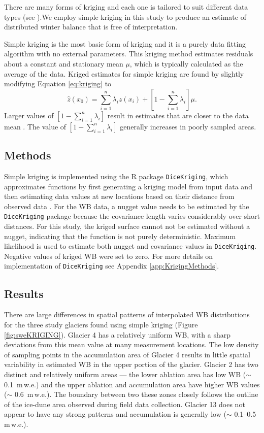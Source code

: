 \documentclass{sfuthesis}
\begin{document}
There are many forms of kriging and each one is tailored to suit different data types (see \cite{Li2014}).We employ simple kriging in this study to produce an estimate of distributed winter balance that is free of interpretation. 

Simple kriging is the most basic form of kriging and it is a purely data fitting algorithm with no external parameters. This kriging method estimates residuals about a constant and stationary mean $\mu$, which is typically calculated as the average of the data. Kriged estimates for simple kriging are found by slightly modifying Equation \ref{eq:kriging} to 
\begin{equation}
\hat{z}(x_0) = \sum_{i=1}^{n} \lambda_i z(x_i) +\left[1-\sum_{i=1}^{n} \lambda_i \right]\mu.
\end{equation}
Larger values of $\left[1-\sum_{i=1}^{n} \lambda_i \right]$ result in estimates that are closer to the data mean \citep{Li2008}. The value of $\left[1-\sum_{i=1}^{n} \lambda_i \right]$ generally increases in poorly sampled areas. 

\subsection{Methods}
\label{sec:kriging_methods}

Simple kriging is implemented using the R package \texttt{DiceKriging}, which approximates functions by first generating a kriging model from input data and then estimating data values at new locations based on their distance from observed data \citep{Roustant2012}. For the WB data, a nugget value needs to be estimated by the \texttt{DiceKriging} package because the covariance length varies considerably over short distances. For this study, the kriged surface cannot not be estimated without a nugget, indicating that the function is not purely deterministic. Maximum likelihood is used to estimate both nugget and covariance values in \texttt{DiceKriging}. Negative values of kriged WB were set to zero. For more details on implementation of \texttt{DiceKriging} see Appendix \ref{app:KrigingMethods}.

\subsection{Results}

There are large differences in spatial patterns of interpolated WB distributions for the three study glaciers found using simple kriging (Figure \ref{fig:sweKRIGING}). Glacier 4 has a relatively uniform WB, with a sharp deviations from this mean value at many measurement locations. The low density of sampling points in the accumulation area of Glacier 4 results in little spatial variability in estimated WB in the upper portion of the glacier. Glacier 2 has two distinct and relatively uniform areas --- the lower ablation area has low WB ($\sim$ 0.1 \,m\,w.e.) and the upper ablation and accumulation area have higher WB values ($\sim$ 0.6 \,m\,w.e.). The boundary between two these zones closely follows the outline of the ice-dune area observed during field data collection. Glacier 13 does not appear to have any strong patterns and accumulation is generally low ($\sim$ 0.1--0.5 \,m\,w.e.). 
\end{document}
